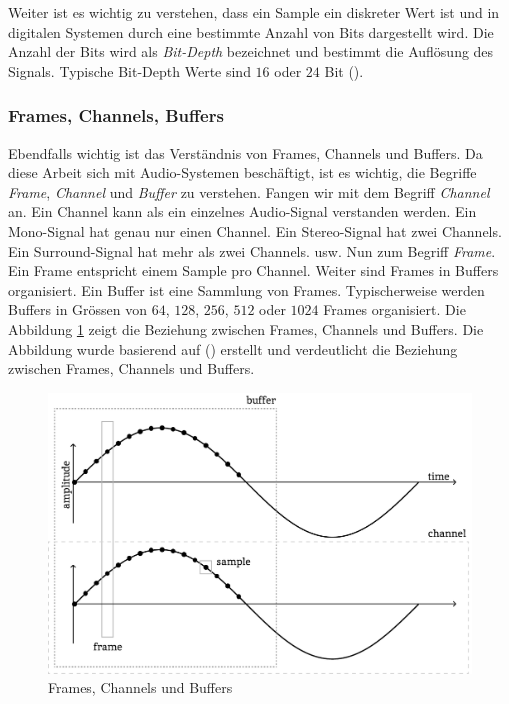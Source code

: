 \documentclass[11pt,a4paper]{article}
\begin{document}
\noindent \newline
Weiter ist es wichtig zu verstehen, dass ein Sample ein diskreter Wert ist und in digitalen 
Systemen durch eine bestimmte Anzahl von Bits dargestellt wird. Die Anzahl der Bits wird
als \textit{Bit-Depth} bezeichnet und bestimmt die Auflösung des Signals. Typische
Bit-Depth Werte sind \(16\) oder \(24\) Bit (\cite[p.10]{somberg2019audioapi}).

\subsubsection{Frames, Channels, Buffers}
Ebendfalls wichtig ist das Verständnis von Frames, Channels und Buffers. Da diese Arbeit sich mit
Audio-Systemen beschäftigt, ist es wichtig, die Begriffe \textit{Frame}, \textit{Channel} und
\textit{Buffer} zu verstehen. Fangen wir mit dem Begriff \textit{Channel} an. Ein Channel kann als
ein einzelnes Audio-Signal verstanden werden. Ein Mono-Signal hat genau nur einen Channel. Ein
Stereo-Signal hat zwei Channels. Ein Surround-Signal hat mehr als zwei Channels. usw.
Nun zum Begriff \textit{Frame}. Ein Frame entspricht einem Sample pro Channel. Weiter sind Frames
in Buffers organisiert. Ein Buffer ist eine Sammlung von Frames. Typischerweise werden Buffers in
Grössen von \(64\), \(128\), \(256\), \(512\) oder \(1024\) Frames organisiert. Die Abbildung
\ref{fig:frames_channels_buffers} zeigt die Beziehung zwischen Frames, Channels und Buffers.
Die Abbildung wurde basierend auf (\cite[p.10]{somberg2019audioapi}) erstellt und verdeutlicht die
Beziehung zwischen Frames, Channels und Buffers.

\begin{figure}[h]
	\centering
	\includegraphics[width=0.7\linewidth]{img/audio-nutshell.pdf}
	\caption{Frames, Channels und Buffers}
	\label{fig:frames_channels_buffers}
\end{figure}
\end{document}
